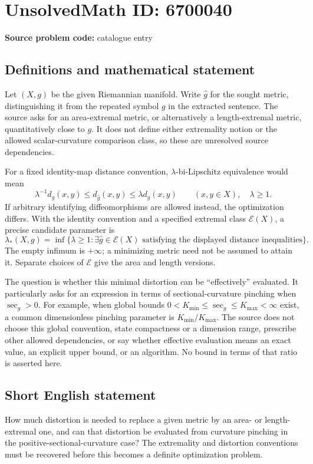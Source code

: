 \documentclass[11pt]{article}
\begin{document}
\section*{UnsolvedMath ID: 6700040}
\textbf{Source problem code:} catalogue entry
\subsection{Definitions and mathematical statement}
Let $(X,g)$ be the given Riemannian manifold. Write $\widehat g$ for the sought metric, distinguishing it from the repeated symbol $g$ in the extracted sentence. The source asks for an area-extremal metric, or alternatively a length-extremal metric, quantitatively close to $g$. It does not define either extremality notion or the allowed scalar-curvature comparison class, so these are unresolved source dependencies.

For a fixed identity-map distance convention, $\lambda$-bi-Lipschitz equivalence would mean
\[
 \lambda^{-1}d_g(x,y)\le d_{\widehat g}(x,y)
       \le\lambda d_g(x,y)\qquad(x,y\in X),\quad\lambda\ge1.
\]
If arbitrary identifying diffeomorphisms are allowed instead, the optimization differs. With the identity convention and a specified extremal class $\mathcal E(X)$, a precise candidate parameter is
\[
 \lambda_*(X,g)=\inf\{\lambda\ge1:
  \exists\widehat g\in\mathcal E(X)
  \text{ satisfying the displayed distance inequalities}\}.
\]
The empty infimum is $+\infty$; a minimizing metric need not be assumed to attain it. Separate choices of $\mathcal E$ give the area and length versions.

The question is whether this minimal distortion can be ``effectively'' evaluated. It particularly asks for an expression in terms of sectional-curvature pinching when $\operatorname{sec}_g>0$. For example, when global bounds $0<K_{\min}\le\operatorname{sec}_g\le K_{\max}<\infty$ exist, a common dimensionless pinching parameter is $K_{\min}/K_{\max}$. The source does not choose this global convention, state compactness or a dimension range, prescribe other allowed dependencies, or say whether effective evaluation means an exact value, an explicit upper bound, or an algorithm. No bound in terms of that ratio is asserted here.
\subsection{Short English statement}
How much distortion is needed to replace a given metric by an area- or length-extremal one, and can that distortion be evaluated from curvature pinching in the positive-sectional-curvature case? The extremality and distortion conventions must be recovered before this becomes a definite optimization problem.
\end{document}
